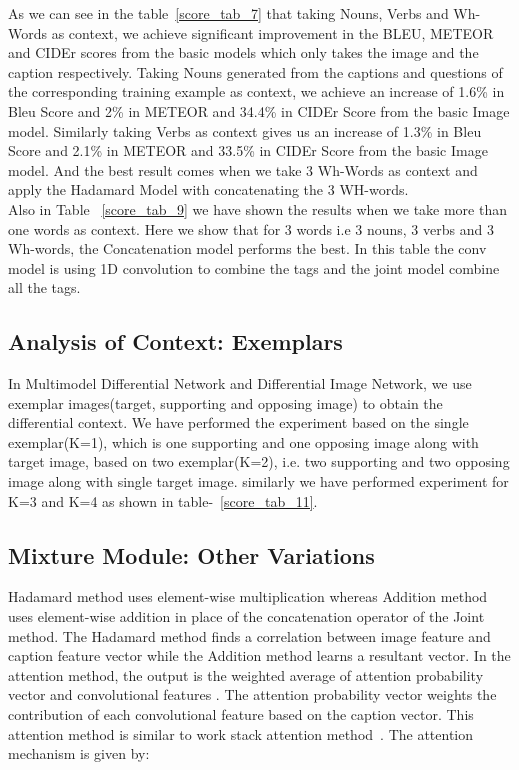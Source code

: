 \documentclass[11pt,a4paper]{article}
\begin{document}
As we can see in the table~\ref{score_tab_7} that taking Nouns, Verbs and Wh-Words as context, we achieve significant improvement in the BLEU, METEOR and CIDEr scores from the basic models which only takes the image and the caption respectively.
Taking Nouns generated from the captions and questions of the corresponding training example as context, we achieve an increase of 1.6\% in Bleu Score and 2\% in METEOR and 34.4\% in CIDEr Score from the basic Image model. Similarly taking Verbs as context gives us an increase of 1.3\% in Bleu Score and 2.1\% in METEOR and 33.5\% in CIDEr Score from the basic Image model. And the best result comes when we take 3 Wh-Words as context and apply the Hadamard Model with concatenating the 3 WH-words. \\
Also in Table ~\ref{score_tab_9} we have shown the results when we take more than one words as context. Here we show that for 3 words i.e 3 nouns, 3 verbs and 3 Wh-words, the Concatenation model performs the best. In this table the conv model is using 1D convolution to combine the tags and the joint model combine all the tags.
\label{sec:context_analysis}


\subsection{Analysis of Context: Exemplars }
\label{sec:model_analysis}
In Multimodel Differential Network and Differential Image Network, we use exemplar images(target, supporting and opposing image) to obtain the differential context. We have performed the experiment based on the single exemplar(K=1), which is one supporting and one opposing image along with target image, based on two exemplar(K=2), i.e. two supporting and two opposing image along with single target image. similarly we have performed experiment for K=3 and K=4 as shown in table-~\ref{score_tab_11}.

 \subsection{Mixture Module: Other Variations} Hadamard method uses element-wise multiplication whereas {Addition method} uses element-wise addition in place of the concatenation operator of the Joint method. The Hadamard method finds a correlation between image feature and caption feature vector while the Addition method learns a resultant vector.
In the attention method, the output  is the weighted average of attention probability vector  and convolutional features . The attention probability vector weights the contribution of each convolutional feature based on the caption vector. This attention method is similar to work stack attention method~\cite{Yang_CVPR2016}. The attention mechanism is given by:
\end{document}

